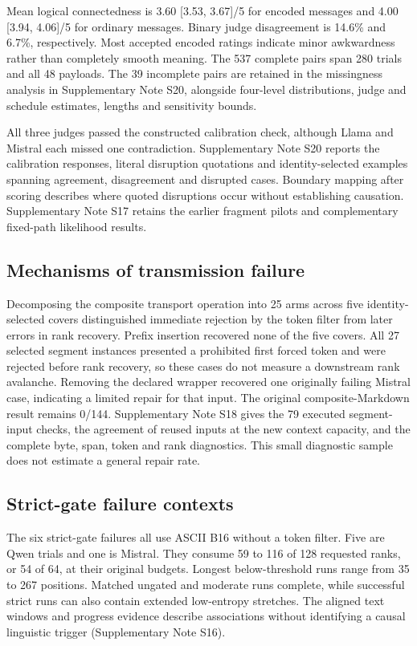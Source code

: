 \documentclass[fleqn,10pt]{wlscirep}
\begin{document}
Mean logical connectedness is 3.60 [3.53, 3.67]/5 for encoded messages and 4.00 [3.94, 4.06]/5 for ordinary messages. Binary judge disagreement is 14.6\% and 6.7\%, respectively. Most accepted encoded ratings indicate minor awkwardness rather than completely smooth meaning. The 537 complete pairs span 280 trials and all 48 payloads. The 39 incomplete pairs are retained in the missingness analysis in Supplementary Note S20, alongside four-level distributions, judge and schedule estimates, lengths and sensitivity bounds.

All three judges passed the constructed calibration check, although Llama and Mistral each missed one contradiction. Supplementary Note S20 reports the calibration responses, literal disruption quotations and identity-selected examples spanning agreement, disagreement and disrupted cases. Boundary mapping after scoring describes where quoted disruptions occur without establishing causation. Supplementary Note S17 retains the earlier fragment pilots and complementary fixed-path likelihood results.


\subsection*{Mechanisms of transmission failure}\label{sec:v4-transport-results}
Decomposing the composite transport operation into 25 arms across five identity-selected covers distinguished immediate rejection by the token filter from later errors in rank recovery. Prefix insertion recovered none of the five covers. All 27 selected segment instances presented a prohibited first forced token and were rejected before rank recovery, so these cases do not measure a downstream rank avalanche. Removing the declared wrapper recovered one originally failing Mistral case, indicating a limited repair for that input. The original composite-Markdown result remains 0/144. Supplementary Note S18 gives the 79 executed segment-input checks, the agreement of reused inputs at the new context capacity, and the complete byte, span, token and rank diagnostics. This small diagnostic sample does not estimate a general repair rate.

\subsection*{Strict-gate failure contexts}\label{sec:v4-entropy-results}
The six strict-gate failures all use ASCII B16 without a token filter. Five are Qwen trials and one is Mistral. They consume 59 to 116 of 128 requested ranks, or 54 of 64, at their original budgets. Longest below-threshold runs range from 35 to 267 positions. Matched ungated and moderate runs complete, while successful strict runs can also contain extended low-entropy stretches. The aligned text windows and progress evidence describe associations without identifying a causal linguistic trigger (Supplementary Note S16).
\end{document}
